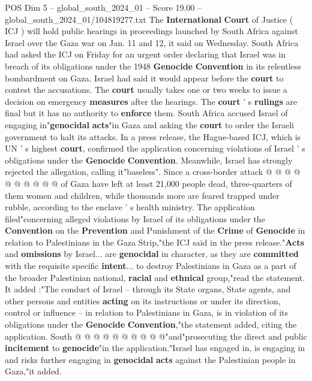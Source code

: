 \begin{textsample}{POS Dim 5 – global\_south\_2024\_01 – Score 19.00 – global\_south\_2024\_01/104819277.txt}  \label{ex:f5_pos_013}
The \textbf{International} \textbf{Court} of Justice ( ICJ ) will hold public hearings in proceedings launched by South Africa against Israel over the Gaza war on Jan. 11 and 12, it said on Wednesday.
South Africa had asked the ICJ on Friday for an urgent order declaring that Israel was in breach of its obligations under the 1948 \textbf{Genocide} \textbf{Convention} in its relentless bombardment on Gaza.
Israel had said it would appear before the \textbf{court} to contest the accusations.
The \textbf{court} usually takes one or two weeks to issue a decision on emergency \textbf{measures} after the hearings.
The \textbf{court} ' s \textbf{rulings} are final but it has no authority to \textbf{enforce} them.
South Africa accused Israel of engaging in"\textbf{genocidal} \textbf{acts}"in Gaza and asking the \textbf{court} to order the Israeli government to halt its attacks.
In a press release, the Hague-based ICJ, which is UN ' s highest \textbf{court}, confirmed the application concerning violations of Israel ' s obligations under the \textbf{Genocide} \textbf{Convention}.
Meanwhile, Israel has strongly rejected the allegation, calling it"baseless".
Since a cross-border attack @ @ @ @ @ @ @ @ @ @ of Gaza have left at least 21,000 people dead, three-quarters of them women and children, while thousands more are feared trapped under rubble, according to the enclave ' s health ministry.
The application filed"concerning alleged violations by Israel of its obligations under the \textbf{Convention} on the \textbf{Prevention} and Punishment of the \textbf{Crime} of \textbf{Genocide} in relation to Palestinians in the Gaza Strip,"the ICJ said in the press release."\textbf{Acts} and \textbf{omissions} by Israel... are \textbf{genocidal} in character, as they are \textbf{committed} with the requisite specific \textbf{intent}... to destroy Palestinians in Gaza as a part of the broader Palestinian national, \textbf{racial} and \textbf{ethnical} group,"read the statement.
It added :"The conduct of Israel -- through its State organs, State agents, and other persons and entities \textbf{acting} on its instructions or under its direction, control or influence -- in relation to Palestinians in Gaza, is in violation of its obligations under the \textbf{Genocide} \textbf{Convention},"the statement added, citing the application.
South @ @ @ @ @ @ @ @ @ @"and"prosecuting the direct and public \textbf{incitement} to \textbf{genocide}"in the application."Israel has engaged in, is engaging in and risks further engaging in \textbf{genocidal} \textbf{acts} against the Palestinian people in Gaza,"it added.

\end{textsample}
